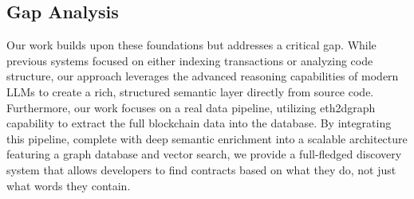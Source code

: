 \subsection{Gap Analysis}
Our work builds upon these foundations but addresses a critical gap. While previous systems focused on either indexing transactions or analyzing code structure, our approach leverages the advanced reasoning capabilities of modern LLMs to create a rich, structured semantic layer directly from source code. Furthermore, our work focuses on a real data pipeline, utilizing eth2dgraph capability to extract the full blockchain data into the database. By integrating this pipeline, complete with deep semantic enrichment into a scalable architecture featuring a graph database and vector search, we provide a full-fledged discovery system that allows developers to find contracts based on what they do, not just what words they contain.